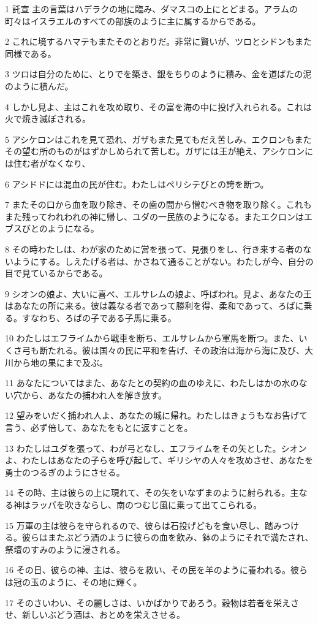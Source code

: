 \par 1 託宣 主の言葉はハデラクの地に臨み、ダマスコの上にとどまる。アラムの町々はイスラエルのすべての部族のように主に属するからである。
\par 2 これに境するハマテもまたそのとおりだ。非常に賢いが、ツロとシドンもまた同様である。
\par 3 ツロは自分のために、とりでを築き、銀をちりのように積み、金を道ばたの泥のように積んだ。
\par 4 しかし見よ、主はこれを攻め取り、その富を海の中に投げ入れられる。これは火で焼き滅ぼされる。
\par 5 アシケロンはこれを見て恐れ、ガザもまた見てもだえ苦しみ、エクロンもまたその望む所のものがはずかしめられて苦しむ。ガザには王が絶え、アシケロンには住む者がなくなり、
\par 6 アシドドには混血の民が住む。わたしはペリシテびとの誇を断つ。
\par 7 またその口から血を取り除き、その歯の間から憎むべき物を取り除く。これもまた残ってわれわれの神に帰し、ユダの一民族のようになる。またエクロンはエブスびとのようになる。
\par 8 その時わたしは、わが家のために営を張って、見張りをし、行き来する者のないようにする。しえたげる者は、かさねて通ることがない。わたしが今、自分の目で見ているからである。
\par 9 シオンの娘よ、大いに喜べ、エルサレムの娘よ、呼ばわれ。見よ、あなたの王はあなたの所に来る。彼は義なる者であって勝利を得、柔和であって、ろばに乗る。すなわち、ろばの子である子馬に乗る。
\par 10 わたしはエフライムから戦車を断ち、エルサレムから軍馬を断つ。また、いくさ弓も断たれる。彼は国々の民に平和を告げ、その政治は海から海に及び、大川から地の果にまで及ぶ。
\par 11 あなたについてはまた、あなたとの契約の血のゆえに、わたしはかの水のない穴から、あなたの捕われ人を解き放す。
\par 12 望みをいだく捕われ人よ、あなたの城に帰れ。わたしはきょうもなお告げて言う、必ず倍して、あなたをもとに返すことを。
\par 13 わたしはユダを張って、わが弓となし、エフライムをその矢とした。シオンよ、わたしはあなたの子らを呼び起して、ギリシヤの人々を攻めさせ、あなたを勇士のつるぎのようにさせる。
\par 14 その時、主は彼らの上に現れて、その矢をいなずまのように射られる。主なる神はラッパを吹きならし、南のつむじ風に乗って出てこられる。
\par 15 万軍の主は彼らを守られるので、彼らは石投げどもを食い尽し、踏みつける。彼らはまたぶどう酒のように彼らの血を飲み、鉢のようにそれで満たされ、祭壇のすみのように浸される。
\par 16 その日、彼らの神、主は、彼らを救い、その民を羊のように養われる。彼らは冠の玉のように、その地に輝く。
\par 17 そのさいわい、その麗しさは、いかばかりであろう。穀物は若者を栄えさせ、新しいぶどう酒は、おとめを栄えさせる。

